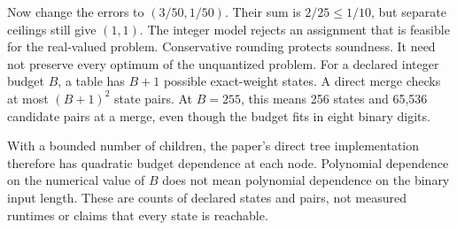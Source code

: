 Now change the errors to $(3/50,1/50)$. Their sum is $2/25\le1/10$, but separate ceilings still give $(1,1)$. The integer model rejects an assignment that is feasible for the real-valued problem. Conservative rounding protects soundness. It need not preserve every optimum of the unquantized problem.
For a declared integer budget $B$, a table has $B+1$ possible exact-weight states. A direct merge checks at most $(B+1)^2$ state pairs. At $B=255$, this means 256 states and 65,536 candidate pairs at a merge, even though the budget fits in eight binary digits.

With a bounded number of children, the paper's direct tree implementation therefore has quadratic budget dependence at each node. Polynomial dependence on the numerical value of $B$ does not mean polynomial dependence on the binary input length. These are counts of declared states and pairs, not measured runtimes or claims that every state is reachable.
